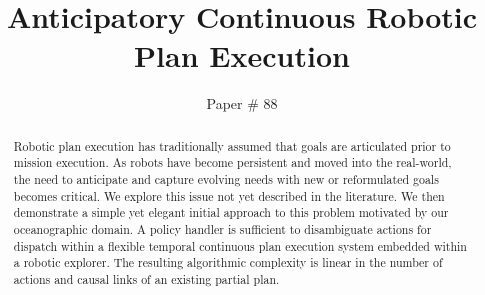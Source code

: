 \documentclass[letterpaper]{article}
\begin{document}
\title{Anticipatory Continuous Robotic Plan Execution}
\author{Paper \# 88}
\maketitle{}

\begin{abstract}

  Robotic plan execution has traditionally assumed that goals are
  articulated prior to mission execution. As robots have become
  persistent and moved into the real-world, the need to anticipate and
  capture evolving needs with new or reformulated goals becomes
  critical.  We explore this issue not yet described in the literature.
  We then demonstrate a simple yet elegant initial approach to this
  problem motivated by our oceanographic domain.  A policy handler
  is sufficient to disambiguate actions for dispatch
  within a flexible temporal continuous plan execution system embedded
  within a robotic explorer.  The resulting algorithmic complexity is
  linear in the number of actions and causal links of an existing
  partial plan.

\end{abstract}






 






\twocolumn 


\end{document}
